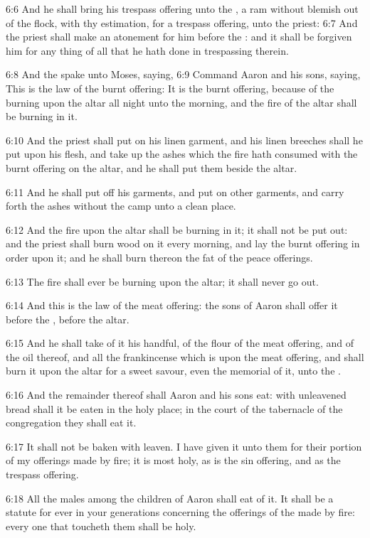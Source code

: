 6:6 And he shall bring his trespass offering unto the \LORD, a ram
without blemish out of the flock, with thy estimation, for a trespass
offering, unto the priest: 6:7 And the priest shall make an atonement
for him before the \LORD: and it shall be forgiven him for any thing of
all that he hath done in trespassing therein.

6:8 And the \LORD spake unto Moses, saying, 6:9 Command Aaron and his
sons, saying, This is the law of the burnt offering: It is the burnt
offering, because of the burning upon the altar all night unto the
morning, and the fire of the altar shall be burning in it.

6:10 And the priest shall put on his linen garment, and his linen
breeches shall he put upon his flesh, and take up the ashes which the
fire hath consumed with the burnt offering on the altar, and he shall
put them beside the altar.

6:11 And he shall put off his garments, and put on other garments, and
carry forth the ashes without the camp unto a clean place.

6:12 And the fire upon the altar shall be burning in it; it shall not
be put out: and the priest shall burn wood on it every morning, and
lay the burnt offering in order upon it; and he shall burn thereon the
fat of the peace offerings.

6:13 The fire shall ever be burning upon the altar; it shall never go
out.

6:14 And this is the law of the meat offering: the sons of Aaron shall
offer it before the \LORD, before the altar.

6:15 And he shall take of it his handful, of the flour of the meat
offering, and of the oil thereof, and all the frankincense which is
upon the meat offering, and shall burn it upon the altar for a sweet
savour, even the memorial of it, unto the \LORD.

6:16 And the remainder thereof shall Aaron and his sons eat: with
unleavened bread shall it be eaten in the holy place; in the court of
the tabernacle of the congregation they shall eat it.

6:17 It shall not be baken with leaven. I have given it unto them for
their portion of my offerings made by fire; it is most holy, as is the
sin offering, and as the trespass offering.

6:18 All the males among the children of Aaron shall eat of it. It
shall be a statute for ever in your generations concerning the
offerings of the \LORD made by fire: every one that toucheth them shall
be holy.

